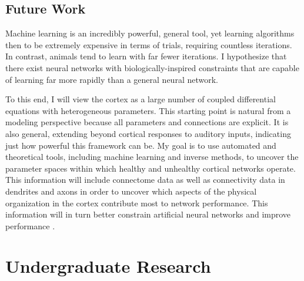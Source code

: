\documentclass[a4paper,11pt]{article}
\begin{document}
\subsection{Future Work}
Machine learning is an incredibly powerful, general tool, yet learning algorithms then to be extremely expensive in terms of trials, requiring countless iterations. In contrast, animals tend to learn with far fewer iterations. I hypothesize that there exist neural networks with biologically-inspired constraints that are capable of learning far more rapidly than a general neural network.

To this end, I will view the cortex as a large number of coupled differential equations with heterogeneous parameters. This starting point is natural from a modeling perspective because all parameters and connections are explicit. It is also general, extending beyond cortical responses to auditory inputs, indicating just how powerful this framework can be. My goal is to use automated and theoretical tools, including machine learning and inverse methods, to uncover the parameter spaces within which healthy and unhealthy cortical networks operate. This information will include connectome data as well as connectivity data in dendrites and axons in order to uncover which aspects of the physical organization in the cortex contribute most to network performance. This information will in turn better constrain artificial neural networks and improve performance \cite{lee2018training}.


\section{Undergraduate Research}\label{sec:undergrad}

\end{document}
